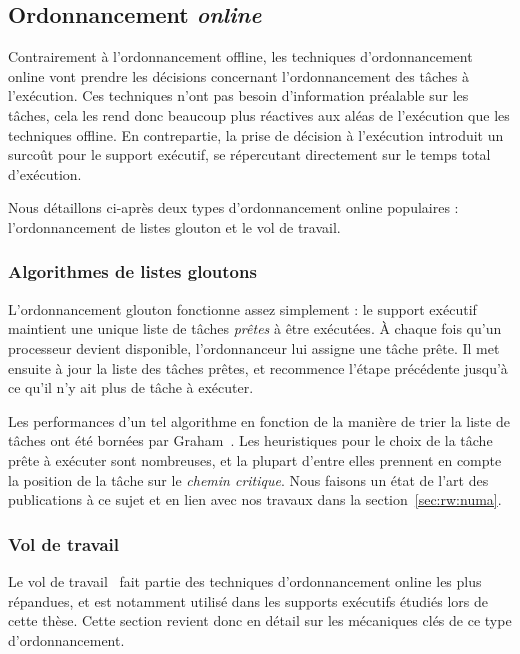 \subsection{Ordonnancement \emph{online}}

Contrairement à l'ordonnancement offline, les techniques d'ordonnancement online vont prendre les décisions concernant l'ordonnancement des tâches à l'exécution.
Ces techniques n'ont pas besoin d'information préalable sur les tâches, cela les rend donc beaucoup plus réactives aux aléas de l'exécution que les techniques offline.
En contrepartie, la prise de décision à l'exécution introduit un surcoût pour le support exécutif, se répercutant directement sur le temps total d'exécution.


Nous détaillons ci-après deux types d'ordonnancement online populaires : l'ordonnancement de listes glouton et le vol de travail.

\subsubsection{Algorithmes de listes gloutons}

L'ordonnancement glouton fonctionne assez simplement : le support exécutif maintient une unique liste de tâches \emph{prêtes} à être exécutées.
À chaque fois qu'un processeur devient disponible, l'ordonnanceur lui assigne une tâche prête.
Il met ensuite à jour la liste des tâches prêtes, et recommence l'étape précédente jusqu'à ce qu'il n'y ait plus de tâche à exécuter.

Les performances d'un tel algorithme en fonction de la manière de trier la liste de tâches ont été bornées par Graham~\cite{Graham1966}.
Les heuristiques pour le choix de la tâche prête à exécuter sont nombreuses, et la plupart d'entre elles prennent en compte la position de la tâche sur le \emph{chemin critique}.
Nous faisons un état de l'art des publications à ce sujet et en lien avec nos travaux dans la section~\ref{sec:rw:numa}.


\subsubsection{Vol de travail}\label{sec:context:runtimes:ws}

Le vol de travail~\cite{Blumofe1996} fait partie des techniques d'ordonnancement online les plus répandues, et est notamment utilisé dans les supports exécutifs étudiés lors de cette thèse.
Cette section revient donc en détail sur les mécaniques clés de ce type d'ordonnancement.

